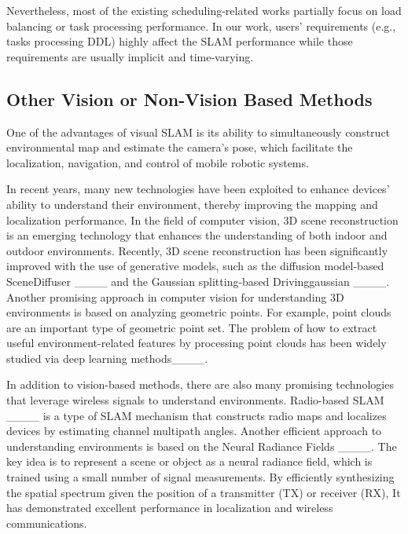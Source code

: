 Nevertheless, most of the existing scheduling-related works partially focus on load balancing or task processing performance. In our work, users' requirements (e.g., tasks processing DDL) highly affect the SLAM performance while those requirements are usually implicit and time-varying. 

{
\subsection{Other Vision or Non-Vision Based Methods} 
One of the advantages of visual SLAM is its ability to simultaneously construct environmental map and estimate the camera's pose, which facilitate the localization, navigation, and control of mobile robotic systems. 


In recent years, many new technologies have been exploited to enhance 
devices' ability to understand their environment, thereby improving the mapping and localization performance. In the field of computer vision, 3D scene reconstruction is an emerging technology that enhances the understanding of both indoor and outdoor environments. 
Recently, 3D scene reconstruction has been significantly improved with the use of generative models, such as the diffusion model-based SceneDiffuser ____ and the Gaussian splitting-based Drivinggaussian ____. 
Another promising approach in computer vision for understanding 3D environments is based on analyzing geometric points. 
For example, point clouds are an important type of geometric point set. The problem of how to extract useful environment-related features by processing point clouds has been widely studied via deep learning methods____. 

In addition to vision-based methods, there are also many promising technologies that leverage wireless signals to understand environments. Radio-based SLAM ____ is a type of SLAM mechanism that constructs radio maps and localizes devices by estimating channel multipath angles. 
Another efficient approach to understanding environments is based on the Neural Radiance Fields ____. The key idea is to represent a scene or object as a neural radiance field, which is trained using a small number of signal measurements. By efficiently synthesizing the spatial spectrum given the position of a transmitter (TX) or receiver (RX), It has demonstrated excellent performance in localization and wireless communications.

}
